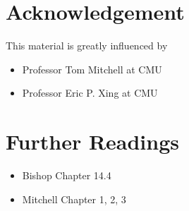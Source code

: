 \documentclass[a4paper]{oblivoir}
\begin{document}
\section*{Acknowledgement}
This material is greatly influenced by
\begin{itemize}\setlength\itemsep{-\parsep}
\item Professor Tom Mitchell at CMU \\
\item Professor Eric P. Xing at CMU
\end{itemize}

\section*{Further Readings}
\begin{itemize}\setlength\itemsep{-\parsep}
\item Bishop Chapter 14.4 \\
\item Mitchell Chapter 1, 2, 3
\end{itemize}
\end{document}
